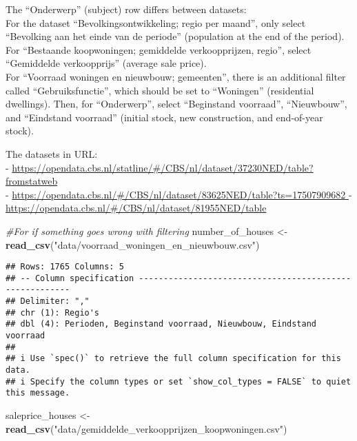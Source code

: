 \documentclass[
]{article}
\newenvironment{Shaded}{\begin{snugshade}}{\end{snugshade}}
\newcommand{\CommentTok}[1]{\textcolor[rgb]{0.56,0.35,0.01}{\textit{#1}}}
\newcommand{\FunctionTok}[1]{\textcolor[rgb]{0.13,0.29,0.53}{\textbf{#1}}}
\newcommand{\NormalTok}[1]{#1}
\newcommand{\OtherTok}[1]{\textcolor[rgb]{0.56,0.35,0.01}{#1}}
\newcommand{\StringTok}[1]{\textcolor[rgb]{0.31,0.60,0.02}{#1}}
\begin{document}
The ``Onderwerp'' (subject) row differs between datasets:\\
For the dataset ``Bevolkingsontwikkeling; regio per maand'', only select
``Bevolking aan het einde van de periode'' (population at the end of the
period).\\
For ``Bestaande koopwoningen; gemiddelde verkoopprijzen, regio'', select
``Gemiddelde verkoopprijs'' (average sale price).\\
For ``Voorraad woningen en nieuwbouw; gemeenten'', there is an
additional filter called ``Gebruiksfunctie'', which should be set to
``Woningen'' (residential dwellings). Then, for ``Onderwerp'', select
``Beginstand voorraad'', ``Nieuwbouw'', and ``Eindstand voorraad''
(initial stock, new construction, and end-of-year stock).

The datasets in URL:\\
-
\url{https://opendata.cbs.nl/statline/\#/CBS/nl/dataset/37230NED/table?fromstatweb}\\
-
\url{https://opendata.cbs.nl/\#/CBS/nl/dataset/83625NED/table?ts=17507909682}\hyperref[0]{\hfill\break
}-
\url{https://opendata.cbs.nl/\#/CBS/nl/dataset/81955NED/table}\hyperref[0]{\hfill\break
}

\begin{Shaded}
\begin{Highlighting}[]
\CommentTok{\#For if something goes wrong with filtering}
\NormalTok{number\_of\_houses }\OtherTok{\textless{}{-}} \FunctionTok{read\_csv}\NormalTok{(}\StringTok{"data/voorraad\_woningen\_en\_nieuwbouw.csv"}\NormalTok{)}
\end{Highlighting}
\end{Shaded}

\begin{verbatim}
## Rows: 1765 Columns: 5
## -- Column specification --------------------------------------------------------
## Delimiter: ","
## chr (1): Regio's
## dbl (4): Perioden, Beginstand voorraad, Nieuwbouw, Eindstand voorraad
## 
## i Use `spec()` to retrieve the full column specification for this data.
## i Specify the column types or set `show_col_types = FALSE` to quiet this message.
\end{verbatim}

\begin{Shaded}
\begin{Highlighting}[]
\NormalTok{saleprice\_houses }\OtherTok{\textless{}{-}} \FunctionTok{read\_csv}\NormalTok{(}\StringTok{"data/gemiddelde\_verkoopprijzen\_koopwoningen.csv"}\NormalTok{)}
\end{Highlighting}
\end{Shaded}
\end{document}
